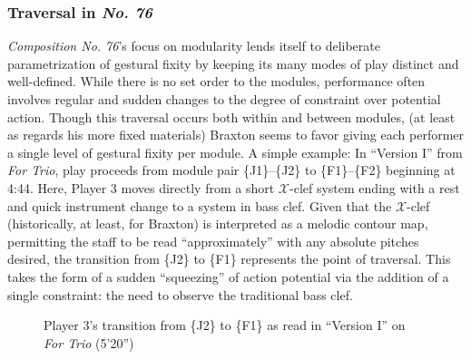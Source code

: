     \subsubsection{Traversal in \textit{No. 76}}

        \textit{Composition No. 76}'s focus on modularity lends itself to deliberate parametrization of gestural fixity by keeping its many modes of play distinct and well-defined. While there is no set order to the modules, performance often involves regular and sudden changes to the degree of constraint over potential action. Though this traversal occurs both within and between modules, (at least as regards his more fixed materials) Braxton seems to favor giving each performer a single level of gestural fixity per module. A simple example: In ``Version I'' from \textit{For Trio}, play proceeds from module pair \{J1\}--\{J2\} to \{F1\}--\{F2\} beginning at 4:44.\autocite[259]{Steinbeck_2018} Here, Player 3 moves directly from a short $\mathscr{X}$-clef system ending with a rest and quick instrument change to a system in bass clef. Given that the $\mathscr{X}$-clef (historically, at least, for Braxton) is interpreted as a melodic contour map, permitting the staff to be read ``approximately'' with any absolute pitches desired, the transition from \{J2\} to \{F1\} represents the point of traversal. This takes the form of a sudden ``squeezing'' of action potential via the addition of a single constraint: the need to observe the traditional bass clef.

            \begin{figure} 
                \centering
                \captionsetup{width=.5\textwidth}
                \caption{Player 3's transition from \{J2\} to \{F1\} as read in ``Version I'' on \textit{For Trio} (5'20'')}
                \label{fig:j2f1transition}
            \end{figure} 
        
